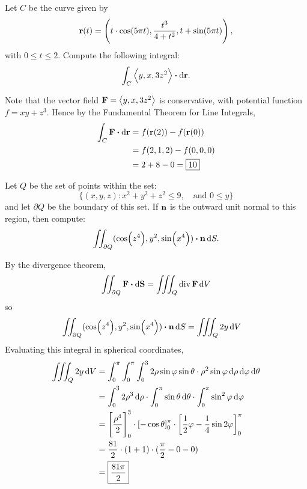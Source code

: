 \documentclass[12pt,answers]{exam}
\newcommand{\vect}[1]{\left\langle #1 \right\rangle}
\newcommand{\tdiv}{\operatorname{div}}
\begin{document}
\begin{questions}
\newpage
\question
Let $C$ be the curve given by
\[
	\vb{r}(t) = \left(t \cdot \cos(5\pi t),
	\frac{t^3}{4+t^2},
	t + \sin(5\pi t)
	\right),
\]
with $0 \le t \le 2$. Compute the following integral:
\[
	\int_C \vect{y, x, 3z^2} \vdot \dif \vb{r}.
\]
\begin{solution}
	Note that the vector field $\vb{F} = \vect{y, x,3z^2}$ is conservative, with potential function $f = xy + z^3$.
	Hence by the Fundamental Theorem for Line Integrals, 
	\begin{align*}
		\int_C \vb{F} \vdot \dif \vb{r}
		 & = f(\vb{r}(2)) - f(\vb{r}(0)) \\
		 & = f(2,1,2) - f(0,0,0)   \\
		 & = 2+8-0
		= \boxed{10}
	\end{align*}
\end{solution}

	\newpage
	\question
	Let $Q$ be the set of points within the set:
	\[
		\{ (x,y,z) : x^2+y^2+z^2 \le 9, \quad \text{and } 0 \le y \}
	\]
	and let $\partial Q$ be the boundary of this set. If $\vb{n}$ is the outward unit normal to this region, then compute:
	\[
		\iint_{\partial Q} (\cos(z^4), y^2, \sin(x^4)) \vdot \vb{n} \dif S.
	\]
	\begin{solution}
		By the divergence theorem, 
		\[
			\iint_{\partial Q} \vb{F} \vdot \dif \vb{S} = \iiint_{Q} \tdiv \vb F \dif V
		\]
		so 
		\begin{align*}
			\iint_{\partial Q} (\cos(z^4), y^2, \sin(x^4)) \vdot \vb{n} \dif S
			&= \iiint_Q 2y \dif V
		\end{align*}
		Evaluating this integral in spherical coordinates,
		\begin{align*}
			\iiint_{Q} 2y \dif V 
			&= \int_{0}^{\pi} \int_0^\pi \int_0^3 2 \rho \sin\varphi \sin\theta \cdot \rho^2 \sin\varphi \dif \rho \dif \varphi \dif \theta\\
			&= \int_0^3 2\rho^3 \dif \rho 
			\cdot
			\int_{0}^{\pi} \sin\theta \dif \theta
			\cdot
			\int_0^\pi \sin^2\varphi \dif \varphi 
			\\
			&= \left[ \frac{\rho^4}{2} \right]_0^3
			\cdot
			\left[-\cos\theta\right]_0^\pi
			\cdot
			\left[\frac12 \varphi - \frac14 \sin2\varphi\right]_0^\pi
			\\
			&= \frac{81}{2} \cdot (1+1) \cdot (\frac\pi2 - 0 - 0) 
			\\
			&= \boxed{\frac{81\pi}{2}}
		\end{align*}
	\end{solution}


\end{questions}
\end{document}
